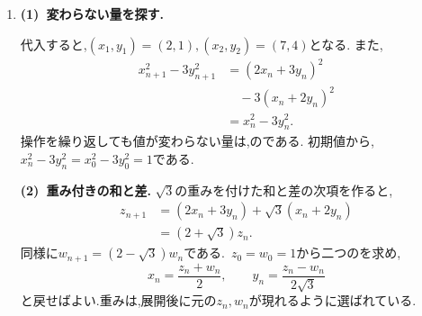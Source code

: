 \begin{enumerate}[label=\textbf{問\arabic*.},leftmargin=3.8em,format=\bookitemlink{practice-bridge}{solution}{problem}]
    \smallskip
    \textbf{(2)~逆数の増分.}
    正値を使って逆数の差を通分すると,
    \[
      b_{n+1}-b_n
      =\frac{a_n-a_{n+1}}{a_na_{n+1}}
      =\frac1{2-a_n}.
    \]
    $0<a_n\le1$より$1\le2-a_n<2$であるから,
    \[
      \frac12\le b_{n+1}-b_n\le1.
    \]
    を求め切らず,上下から押さえる.

    \smallskip
    \textbf{(3)~不等式を足す.}
    $b_1=1$である.$n\ge2$では,(2)を$k=1,\ldots,n-1$について足すと,
    \[
      \frac{n-1}{2}\le b_n-1\le n-1.
    \]
    よって,$\frac{n+1}{2}\le b_n\le n$である.この式は$n=1$でも成り立つ.
    すべて正なので,逆数を取ると不等号の向きが変わり,
    \[
      \frac1n\le a_n\le\frac2{n+1}.
    \]
    両端が$0$に近づくから,はさみうちの原理で$a_n\to0$を得る.
    逆数化とを,から不等式の評価へ広げた.
  \item \textbf{(1)~変わらない量を探す.}\par\nobreak
    代入すると,$(x_1,y_1)=(2,1),(x_2,y_2)=(7,4)$となる.
    また,
    \begin{align*}
      x_{n+1}^2-3y_{n+1}^2
      &=(2x_n+3y_n)^2\\
      &\quad-3(x_n+2y_n)^2\\
      &=x_n^2-3y_n^2.
    \end{align*}
    操作を繰り返しても値が変わらない量は,のである.
    初期値から,$x_n^2-3y_n^2=x_0^2-3y_0^2=1$である.

    \smallskip
    \textbf{(2)~重み付きの和と差.}
    $\sqrt3$の重みを付けた和と差の次項を作ると,
    \begin{align*}
      z_{n+1}
      &=(2x_n+3y_n)+\sqrt3(x_n+2y_n)\\
      &=(2+\sqrt3)z_n.
    \end{align*}
    同様に$w_{n+1}=(2-\sqrt3)w_n$である.\,
    $z_0=w_0=1$から二つのを求め,
    \[
      x_n=\frac{z_n+w_n}{2},\qquad
      y_n=\frac{z_n-w_n}{2\sqrt3}
    \]
    と戻せばよい.重みは,展開後に元の$z_n,w_n$が現れるように選ばれている.


\end{enumerate}

